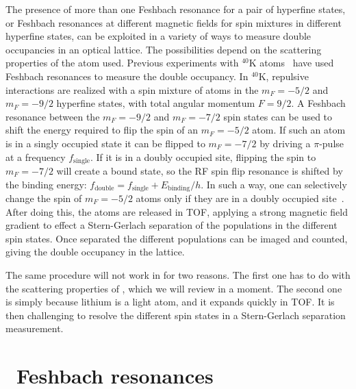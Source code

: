 The presence of more than one Feshbach resonance for a pair of hyperfine
states, or Feshbach resonances at different magnetic fields for spin mixtures
in different hyperfine states,  can be exploited in a variety of ways to
measure double occupancies in an optical lattice.    The possibilities depend
on the scattering properties of the atom used.   Previous experiments with
$^{40}$K atoms~\cite{Jordens2010,Schneider2010}  have used Feshbach resonances
to  measure the double occupancy.  In $^{40}$K, repulsive interactions are
realized with a spin mixture of atoms in the $m_{F}=-5/2$ and $m_{F}=-9/2$
hyperfine states, with total angular momentum $F=9/2$.   A Feshbach resonance
between the $m_{F}=-9/2$ and $m_{F}=-7/2$ spin states can be used to shift the
energy required to flip the spin of an $m_{F}=-5/2$ atom.    If such an atom is
in a singly occupied state it can be flipped to $m_{F}=-7/2$ by driving a
$\pi$-pulse at a frequency $f_{\mathrm{single}}$. If it is in a doubly occupied
site,  flipping the spin to $m_{F}=-7/2$ will create a bound state, so the RF
spin flip resonance is shifted by the binding energy: $f_{\mathrm{double}} =
f_{\mathrm{single}} + E_{\mathrm{binding}}/h$.  In such a way, one can
selectively change the spin of $m_{F}=-5/2$ atoms only if they are in a doubly
occupied site~\cite{PhysRevLett.96.030401}.    After doing this, the atoms are
released in TOF, applying a strong magnetic field gradient to effect a
Stern-Gerlach separation of the populations in the different spin states.
Once separated the different populations can be imaged and counted, giving the
double occupancy in the lattice. 

The same procedure will not work in \li for two reasons.  The first one has to
do with the scattering properties of \li, which we will review in a moment.
The second one is simply because lithium is a light atom, and it expands
quickly in TOF.  It is then challenging to resolve the different spin states in
a Stern-Gerlach separation measurement.




\section{\li\ Feshbach resonances}

